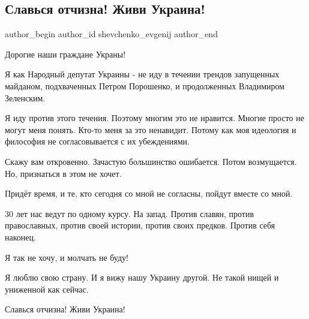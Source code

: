  
 
 
 
 
 
\subsection{Славься отчизна! Живи Украина!}
\label{sec:08_01_2022.fb.shevchenko_evgenij.1.zhivi_ukraina}
 
\ifcmt
 author_begin
   author_id shevchenko_evgenij
 author_end
\fi

Дорогие наши граждане Украны! 

Я как Народный депутат Украины -  не иду в течении трендов запущенных майданом,
подхваченных Петром Порошенко, и продолженных Владимиром Зеленским. 

Я иду против этого течения. Поэтому многим это не нравится. Многие просто не
могут меня понять. Кто-то меня за это ненавидит. Потому как моя идеология и
философия не согласовывается  с их убеждениями. 

Скажу вам откровенно. Зачастую большинство ошибается. Потом возмущается. Но,
признаться в этом не хочет. 

Придёт время, и те, кто сегодня со мной не согласны, пойдут вместе со мной. 

30 лет нас ведут по одному курсу. На запад. Против славян, против
православных, против своей истории, против своих предков. Против себя
наконец. 

Я так не хочу, и молчать не буду! 

Я люблю свою страну. И я вижу нашу Украину другой. Не такой нищей  и униженной
как сейчас. 

Славься отчизна! Живи Украина!

